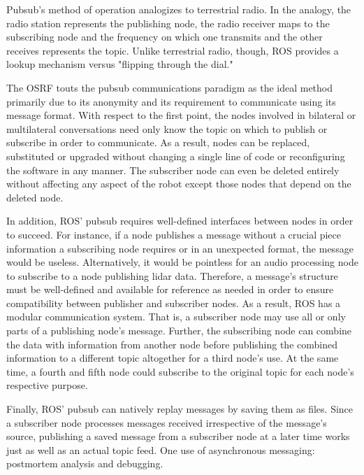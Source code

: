 \documentclass[9pt,twocolumn,twoside]{../../styles/osajnl}
\begin{document}
Pubsub's method of operation analogizes to terrestrial radio.  In the analogy, the radio station represents the publishing node, the radio receiver maps to the subscribing node and the frequency on which one transmits and the other receives represents the topic.  Unlike terrestrial radio, though, ROS provides a lookup mechanism versus "flipping through the dial."

The OSRF touts the pubsub communications paradigm as the ideal method  primarily due to its anonymity and its requirement to communicate using its message format.  With respect to the first point, the nodes involved in bilateral or multilateral conversations need only know the topic on which to publish or subscribe in order to communicate.  As a result, nodes can be replaced, substituted or upgraded without changing a single line of code or reconfiguring the software in any manner.  The subscriber node can even be deleted entirely without affecting any aspect of the robot except those nodes that depend on the deleted node.

In addition, ROS' pubsub requires well-defined interfaces between nodes in order to succeed.  For instance, if a node publishes a message without a crucial piece information a subscribing node requires or in an unexpected format, the message would be useless.  Alternatively, it would be pointless for an audio processing node to subscribe to a node publishing lidar data.  Therefore, a message's structure must be well-defined and available for reference as needed in order to ensure compatibility between publisher and subscriber nodes.  As a result, ROS has a modular communication system.  That is, a subscriber node may use all or only parts of a publishing node's message.  Further, the subscribing node can combine the data with information from another node before publishing the combined information to a different topic altogether for a third node's use.  At the same time, a fourth and fifth node could subscribe to the original topic for each node's respective purpose.  

Finally, ROS' pubsub can natively replay messages by saving them as files.  Since a subscriber node processes messages received irrespective of the message's source, publishing a saved message from a subscriber node at a later time works just as well as an actual topic feed.  One use of asynchronous messaging: postmortem analysis and debugging.
\end{document}
